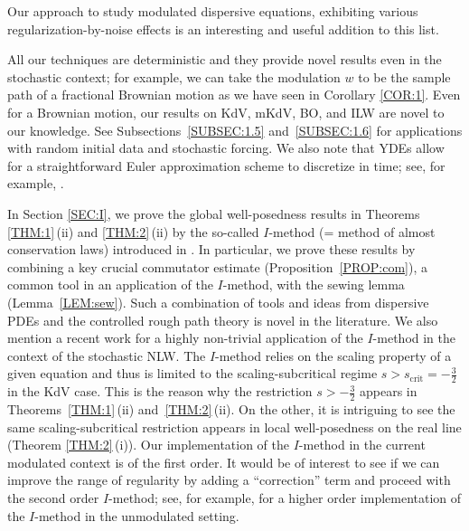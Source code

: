 \documentclass[letterpaper, 11pt,  reqno]{amsart}
\newcommand{\1}{\hspace{0.5mm}\text{I}\hspace{0.5mm}}
\newcommand{\noi}{\noindent}
\numberwithin{equation}{section}
\numberwithin{theorem}{section}
\begin{document}
\noi
Our approach to study modulated dispersive equations, 
exhibiting various regularization-by-noise effects
is an interesting and useful addition to this list.







All our techniques are deterministic and they provide novel results even in the stochastic context; for example,   we can take the modulation $w$ to be the sample path of a fractional Brownian motion
as we have seen in Corollary \ref{COR:1}. 
Even for a Brownian motion, our results on KdV, mKdV, BO, and ILW are novel  to our knowledge.
See Subsections~\ref{SUBSEC:1.5} and~\ref{SUBSEC:1.6}
for applications with random initial data and stochastic forcing.
We also note that 
YDEs
allow for a straightforward Euler approximation scheme
to discretize in time; see, for example,  \cite[Subsection 2.3]{CG1}.


\medskip


In Section \ref{SEC:I}, we prove the global well-posedness results
in Theorems \ref{THM:1}\,(ii) and \ref{THM:2}\,(ii)
by the so-called $I$-method (= method of almost conservation laws)
introduced in \cite{CKSTT03}.
In particular, we prove these results
by 
combining a key crucial commutator estimate (Proposition~\ref{PROP:com}), 
a common  tool in an application 
of the $I$-method, with the sewing lemma (Lemma~\ref{LEM:sew}).
Such a combination of tools and ideas from dispersive PDEs and the controlled rough path theory is novel in the literature.
We also mention a recent work \cite{GKOT}
for 
a highly non-trivial application of 
the $I$-method in the context of the stochastic NLW.
The $I$-method relies on the scaling property
of a given equation and thus is limited to the scaling-subcritical regime
$s > s_\text{crit} = -\frac 32$ in the KdV case.
This is the reason why the restriction $s > -\frac 32$ appears in Theorems~\ref{THM:1}\,(ii)
and~\ref{THM:2}\,(ii).
On the other, it is 
intriguing to see the same scaling-subcritical restriction appears
in  local well-posedness on the real line (Theorem \ref{THM:2}\,(i)).
Our implementation of the $I$-method in the current modulated context is of the first order.
It would be of interest to see if we can improve the range of regularity
by adding a ``correction'' term
and proceed with the second order $I$-method;
see, for example,  \cite{CKSTT03} for a higher order implementation of the $I$-method
in the unmodulated setting.
\end{document}
